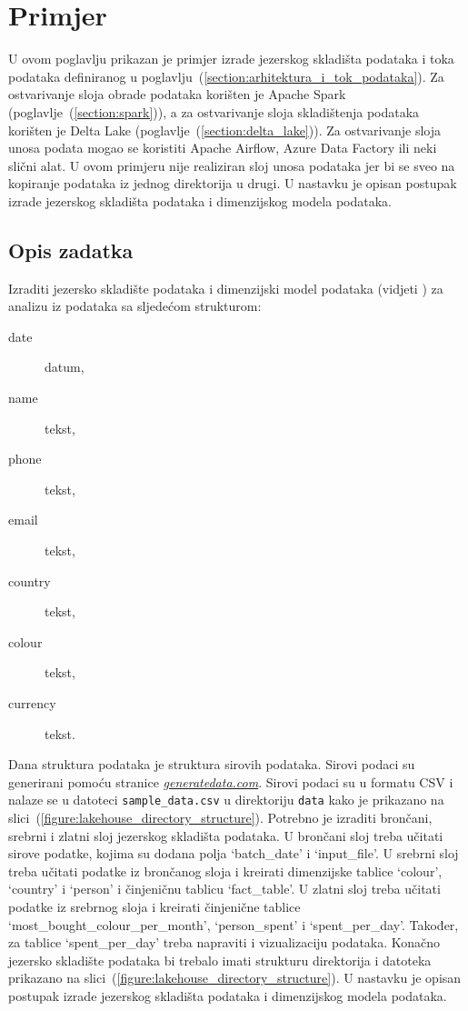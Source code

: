 \chapter{Primjer} \label{chapter:primjer}

U ovom poglavlju prikazan je primjer izrade jezerskog skladišta podataka i toka
podataka definiranog u poglavlju~(\ref{section:arhitektura_i_tok_podataka}). Za
ostvarivanje sloja obrade podataka korišten je Apache Spark
(poglavlje~(\ref{section:spark})), a za ostvarivanje sloja skladištenja podataka
korišten je Delta Lake (poglavlje~(\ref{section:delta_lake})). Za ostvarivanje
sloja unosa podata mogao se koristiti Apache Airflow, Azure Data Factory ili
neki slični alat. U ovom primjeru nije realiziran sloj unosa podataka jer bi
se sveo na kopiranje podataka iz jednog direktorija u drugi. U nastavku je
opisan postupak izrade jezerskog skladišta podataka i dimenzijskog modela
podataka.

\section{Opis zadatka} \label{section:opis_zadatka}

Izraditi jezersko skladište podataka i dimenzijski model podataka (vidjeti
\citep{dimensionalmodel2023}) za analizu iz podataka sa sljedećom strukturom:
\begin{description}
    \item[date] datum,
    \item[name] tekst,
    \item[phone] tekst,
    \item[email] tekst,
    \item[country] tekst,
    \item[colour] tekst,
    \item[currency] tekst.      
\end{description}
Dana struktura podataka je struktura sirovih podataka. Sirovi podaci su generirani
pomoću stranice \href{https://generatedata.com/}{\textit{generatedata.com}}. Sirovi
podaci su u formatu CSV i nalaze se u datoteci \texttt{sample\_data.csv} u
direktoriju \texttt{data} kako je prikazano na
slici~(\ref{figure:lakehouse_directory_structure}). Potrebno je izraditi
brončani, srebrni i zlatni sloj jezerskog skladišta podataka. U brončani sloj
treba učitati sirove podatke, kojima su dodana polja `batch\_date' i
`input\_file'. U srebrni sloj treba učitati podatke iz brončanog sloja i
kreirati dimenzijske tablice `colour', `country' i `person' i činjeničnu
tablicu `fact\_table'. U zlatni sloj treba učitati podatke iz srebrnog sloja i
kreirati činjenične tablice `most\_bought\_colour\_per\_month', `person\_spent'
i `spent\_per\_day'. Također, za tablice `spent\_per\_day' treba napraviti i
vizualizaciju podataka. Konačno jezersko skladište podataka bi trebalo imati
strukturu direktorija i datoteka prikazano na
slici~(\ref{figure:lakehouse_directory_structure}). U nastavku je opisan
postupak izrade jezerskog skladišta podataka i dimenzijskog modela podataka.

